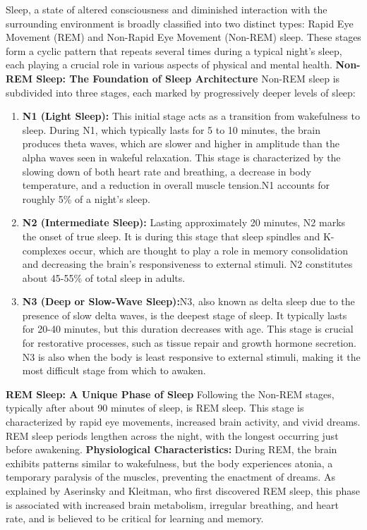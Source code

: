 \documentclass[12pt, a4paper,oneside]{book}
\numberwithin{equation}{section}
\begin{document}
Sleep, a state of altered consciousness and diminished interaction with the surrounding environment is broadly classified into two distinct types: Rapid Eye Movement (REM) and Non-Rapid Eye Movement (Non-REM) sleep. These stages form a cyclic pattern that repeats several times during a typical night's sleep, each playing a crucial role in various aspects of physical and mental health.\newline
\textbf{Non-REM Sleep: The Foundation of Sleep Architecture}\newline
Non-REM sleep is subdivided into three stages, each marked by progressively deeper levels of sleep:\newline
\begin{enumerate}
    \item \textbf{N1 (Light Sleep):} This initial stage acts as a transition from wakefulness to sleep. During N1, which typically lasts for 5 to 10 minutes, the brain produces theta waves, which are slower and higher in amplitude than the alpha waves seen in wakeful relaxation. This stage is characterized by the slowing down of both heart rate and breathing, a decrease in body temperature, and a reduction in overall muscle tension.N1 accounts for roughly 5\%  of a night's sleep.\cite{Berry2012}
    \item \textbf{N2 (Intermediate Sleep):} Lasting approximately 20 minutes, N2 marks the onset of true sleep. It is during this stage that sleep spindles and K-complexes occur, which are thought to play a role in memory consolidation and decreasing the brain's responsiveness to external stimuli. N2 constitutes about 45-55\% of total sleep in adults.\cite{Steriade2006}
    \item \textbf{N3 (Deep or Slow-Wave Sleep):}N3, also known as delta sleep due to the presence of slow delta waves, is the deepest stage of sleep. It typically lasts for 20-40 minutes, but this duration decreases with age. This stage is crucial for restorative processes, such as tissue repair and growth hormone secretion. N3 is also when the body is least responsive to external stimuli, making it the most difficult stage from which to awaken. \cite{VanCauter2000}
\end{enumerate}
\textbf{REM Sleep: A Unique Phase of Sleep}
Following the Non-REM stages, typically after about 90 minutes of sleep, is REM sleep. This stage is characterized by rapid eye movements, increased brain activity, and vivid dreams. REM sleep periods lengthen across the night, with the longest occurring just before awakening.
\newline\textbf{Physiological Characteristics:} During REM, the brain exhibits patterns similar to wakefulness, but the body experiences atonia, a temporary paralysis of the muscles, preventing the enactment of dreams. As explained by Aserinsky and Kleitman, who first discovered REM sleep, this phase is associated with increased brain metabolism, irregular breathing, and heart rate, and is believed to be critical for learning and memory.\cite{Aserinsky1953}
\end{document}
